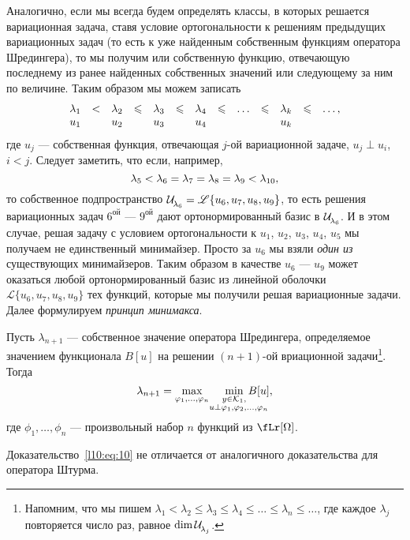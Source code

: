 Аналогично, если мы всегда будем определять классы, в которых решается вариационная задача, ставя условие ортогональности к решениям предыдущих вариационных задач (то есть к уже найденным собственным функциям оператора Шредингера), то мы получим или собственную функцию, отвечающую последнему из ранее найденных собственных значений или следующему за ним по величине. Таким образом мы можем записать
\begin{equation}\label{l10:eq:9}
	\hfill\begin{array}{ccccccccccccc}
		\lambda_1&<&\lambda_2&\leqslant&\lambda_3&\leqslant&\lambda_4&\leqslant&\ldots&\leqslant&\lambda_k&\leqslant&\ldots,\\
		u_1& &u_2& &u_3& &u_4& & & &u_k& &\\
	\end{array}\hfill
\end{equation} 
где $u_j$ --- собственная функция, отвечающая $j$-ой вариационной задаче, $u_j\perp u_i$, $i<j$. Следует заметить, что если, например, 
\begin{equation*}
	\hfill\lambda_5<\lambda_6=\lambda_7=\lambda_8=\lambda_9<\lambda_{10},\hfill
\end{equation*}
то собственное подпространство $\Ul[\lambda_6]=\mathscr{L}\{u_6,u_7,u_8,u_9\}$, то есть решения вариационных задач $6^{\text{ой}}$ --- $9^{\text{ой}}$ дают ортонормированный базис в $\Ul[\lambda_6]$. И в этом случае, решая задачу с условием ортогональности к $u_1$, $u_2$, $u_3$, $u_4$, $u_5$ мы получаем не единственный минимайзер. Просто за $u_6$ мы взяли \emph{один из} существующих минимайзеров. Таким образом в качестве $u_6$ --- $u_9$ может оказаться любой ортонормированный базис из линейной оболочки $\mathscr{L}\{u_6,u_7,u_8,u_9\}$ тех функций, которые мы получили решая вариационные задачи. Далее формулируем \emph{принцип минимакса}.
\begin{_teor}
	Пусть $\lambda_{n+1}$ --- собственное значение оператора Шредингера, определяемое значением функционала $B[u]$ на решении $(n+1)$-ой вриационной задачи\footnote{\label{l10:fn:1}Напомним, что мы пишем $\lambda_1<\lambda_2\leqslant\lambda_3\leqslant\lambda_4\leqslant\ldots\leqslant\lambda_n\leqslant\ldots$, где каждое $\lambda_j$ повторяется число раз, равное $\dim\Ul[\lambda_j]$.}. Тогда
	\begin{equation}\label{l10:eq:10}
		\hfill\lambda_{n+1}=\max\limits_{\phi_1,\ldots,\phi_{n}}\quad\min\limits_{\substack{y\in\K_1,\\\lefteqn{\scriptstyle \hspace*{-0.8cm}u\perp\phi_1,\phi_2,\ldots,\phi_{n}}}}B[u],\hfill
	\end{equation}
	где $\phi_1,\ldots,\phi_n$ --- произвольный набор $n$ функций из $\fLr[\Omega]$.
\end{_teor}
\noindent Доказательство~\eqref{l10:eq:10} не отличается от аналогичного доказательства для оператора Штурма.

